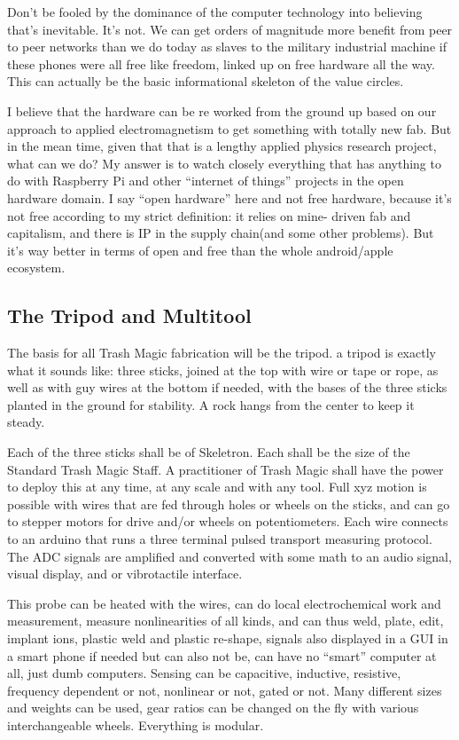 Don't be fooled by the dominance of the computer technology into
believing that's inevitable. It's not. We can get orders of magnitude
more benefit from peer to peer networks than we do today as slaves to
the military industrial machine if these phones were all free like
freedom, linked up on free hardware all the way. This can actually be
the basic informational skeleton of the value circles.

I believe that the hardware can be re worked from the ground up based on
our approach to applied electromagnetism to get something with totally
new fab. But in the mean time, given that that is a lengthy applied
physics research project, what can we do? My answer is to watch closely
everything that has anything to do with Raspberry Pi and other
``internet of things'' projects in the open hardware domain. I say
``open hardware'' here and not free hardware, because it's not free
according to my strict definition: it relies on mine- driven fab and
capitalism, and there is IP in the supply chain(and some other
problems). But it's way better in terms of open and free than the whole
android/apple ecosystem.

\subsection{The Tripod and Multitool}\label{the-tripod-and-multitool}

The basis for all Trash Magic fabrication will be the tripod. a tripod
is exactly what it sounds like: three sticks, joined at the top with
wire or tape or rope, as well as with guy wires at the bottom if needed,
with the bases of the three sticks planted in the ground for stability.
A rock hangs from the center to keep it steady.

Each of the three sticks shall be of Skeletron. Each shall be the size
of the Standard Trash Magic Staff. A practitioner of Trash Magic shall
have the power to deploy this at any time, at any scale and with any
tool. Full xyz motion is possible with wires that are fed through holes
or wheels on the sticks, and can go to stepper motors for drive and/or
wheels on potentiometers. Each wire connects to an arduino that runs a
three terminal pulsed transport measuring protocol. The ADC signals are
amplified and converted with some math to an audio signal, visual
display, and or vibrotactile interface.

This probe can be heated with the wires, can do local electrochemical
work and measurement, measure nonlinearities of all kinds, and can thus
weld, plate, edit, implant ions, plastic weld and plastic re-shape,
signals also displayed in a GUI in a smart phone if needed but can also
not be, can have no ``smart'' computer at all, just dumb computers.
Sensing can be capacitive, inductive, resistive, frequency dependent or
not, nonlinear or not, gated or not. Many different sizes and weights
can be used, gear ratios can be changed on the fly with various
interchangeable wheels. Everything is modular.

